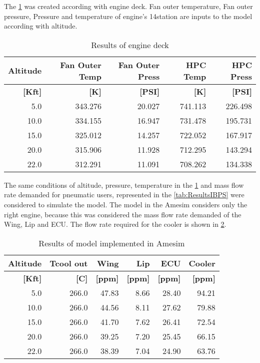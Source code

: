 The \ref{tab:ResultsEngine} was created according with engine deck. Fan outer temperature, Fan outer pressure, Pressure and temperature of engine's 14\degree station are inputs to the model according with altitude.

\begin{table}[htbp]
  \centering
  \caption{Results of engine deck}
    \begin{tabular}{rrrrr}
    \toprule
    \textbf{Altitude} & \textbf{Fan Outer Temp} & \textbf{Fan Outer Press} & \textbf{HPC Temp} & \textbf{HPC Press} \\
    \midrule
    \textbf{[Kft]} & \textbf{[K]} & \textbf{[PSI]} & \textbf{[K]} & \textbf{[PSI]} \\
    5.0   & 343.276 & 20.027 & 741.113 & 226.498 \\
    10.0  & 334.155 & 16.947 & 731.478 & 195.731 \\
    15.0  & 325.012 & 14.257 & 722.052 & 167.917 \\
    20.0  & 315.906 & 11.928 & 712.295 & 143.294 \\
    22.0  & 312.291 & 11.091 & 708.262 & 134.338 \\
    \bottomrule
    \end{tabular}%
  \label{tab:ResultsEngine}%
\end{table}%

The same conditions of altitude, pressure, temperature  in the \ref{tab:ResultsEngine} and mass flow rate demanded for pneumatic users, represented in the \ref{tab:ResultsIBPS} were considered to simulate the model.
The model in the Amesim considers only the right engine, because this was considered the mass flow rate demanded of the Wing, Lip and ECU. The flow rate required for the cooler is shown in \ref{tab:ResultsAmesim}.

\begin{table}[htbp]
  \centering
  \caption{Results of model implemented in Amesim}
    \begin{tabular}{rrrrrr}
    \toprule
    \textbf{Altitude} & \textbf{Tcool out} & \textbf{Wing} & \textbf{Lip} & \textbf{ECU} & \textbf{Cooler} \\
    \midrule
    \textbf{[Kft]} & \textbf{[C]} & \textbf{[ppm]} & \textbf{[ppm]} & \textbf{[ppm]} & \textbf{[ppm]} \\
    5.0   & 266.0 & 47.83 & 8.66  & 28.40 & 94.21 \\
    10.0  & 266.0 & 44.56 & 8.11  & 27.62 & 79.88 \\
    15.0  & 266.0 & 41.70 & 7.62  & 26.41 & 72.54 \\
    20.0  & 266.0 & 39.25 & 7.20  & 25.45 & 66.15 \\
    22.0  & 266.0 & 38.39 & 7.04  & 24.90 & 63.76 \\
    \bottomrule
    \end{tabular}%
  \label{tab:ResultsAmesim}%
\end{table}%


